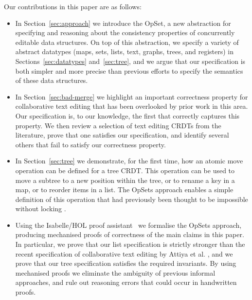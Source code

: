 \documentclass[11pt]{article}
\begin{document}
Our contributions in this paper are as follows:

\begin{itemize}
\item In Section~\ref{sec:approach} we introduce the OpSet, a new abstraction for specifying and reasoning about the consistency properties of concurrently editable data structures.
On top of this abstraction, we specify a variety of abstract datatypes (maps, sets, lists, text, graphs, trees, and registers) in Sections~\ref{sec:datatypes} and~\ref{sec:tree}, and we argue that our specification is both simpler and more precise than previous efforts to specify the semantics of these data structures.

\item In Section~\ref{sec:bad-merge} we highlight an important correctness property for collaborative text editing that has been overlooked by prior work in this area.
Our specification is, to our knowledge, the first that correctly captures this property.
We then review a selection of text editing CRDTs from the literature, prove that one satisfies our specification, and identify several others that fail to satisfy our correctness property.

\item In Section~\ref{sec:tree} we demonstrate, for the first time, how an atomic move operation can be defined for a tree CRDT.
This operation can be used to move a subtree to a new position within the tree, or to rename a key in a map, or to reorder items in a list.
The OpSets approach enables a simple definition of this operation that had previously been thought to be impossible without locking \cite{Najafzadeh:2017vk}.

\item Using the Isabelle/HOL proof assistant~\cite{DBLP:conf/tphol/WenzelPN08} we formalise the OpSets approach, producing mechanised proofs of correctness of the main claims in this paper.
In particular, we prove that our list specification is strictly stronger than the recent specification of collaborative text editing by Attiya et al. \cite{Attiya:2016kh}, and we prove that our tree specification satisfies the required invariants.
By using mechanised proofs we eliminate the ambiguity of previous informal approaches, and rule out reasoning errors that could occur in handwritten proofs.
\end{itemize}






\end{document}
